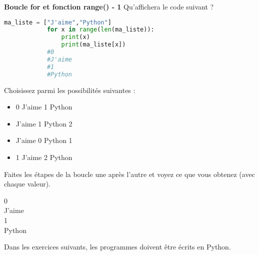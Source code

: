 	\begin{Exercice}[5 minutes] \textbf{Boucle for et fonction range() - 1}
      	Qu'affichera le code suivant ?
      	
      	\begin{lstlisting}[language=Python]
         	ma_liste = ["J'aime","Python"]
      		for x in range(len(ma_liste)):
      			print(x)
           		print(ma_liste[x])
           	#0
           	#J'aime
           	#1
           	#Python
     	\end{lstlisting}
             	
        Choisissez parmi les possibilités suivantes :
        
        \begin{itemize}
        
        \item 0 
        J'aime 
        1 
        Python 
        \item J'aime  
        1 
        Python 
        2     
        \item J'aime 
        0 
        Python 
        1 
        \item 1 
        J'aime 
        2
        Python
        \end{itemize}
    
        \begin{conseil}
		   Faites les étapes de la boucle une après l'autre et voyez ce que vous obtenez (avec chaque valeur).  
        \end{conseil}
        
        \begin{solution}
            0\\
            J'aime\\
            1\\
            Python
            
        \end{solution}
    \end{Exercice} 	
	
	Dans les exercices suivants, les programmes doivent être écrits en Python.\\	
	
